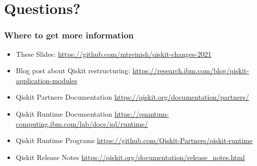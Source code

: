 \documentclass[aspectratio=169,11pt,hyperref={colorlinks=true}]{beamer}
\begin{document}
\section{Questions?}
\begin{frame}
\frametitle{Where to get more information}
    \begin{itemize}
        \item These Slides: \href{https://github.com/mtreinish/qiskit-changes-2021}{https://github.com/mtreinish/qiskit-changes-2021}
        \item Blog post about Qiskit restructuring: \href{https://research.ibm.com/blog/qiskit-application-modules}{https://research.ibm.com/blog/qiskit-application-modules}
        \item Qiskit Partners Documentation \href{https://qiskit.org/documentation/partners/}{https://qiskit.org/documentation/partners/}
        \item Qiskit Runtime Documentation \href{https://quantum-computing.ibm.com/lab/docs/iql/runtime/}{https://quantum-computing.ibm.com/lab/docs/iql/runtime/}
        \item Qiskit Runtime Programs \href{https://github.com/Qiskit-Partners/qiskit-runtime}{https://github.com/Qiskit-Partners/qiskit-runtime}
        \item Qiskit Release Notes \href{https://qiskit.org/documentation/release\_notes.html}{https://qiskit.org/documentation/release\_notes.html}
    \end{itemize}
\end{frame}
\end{document}
